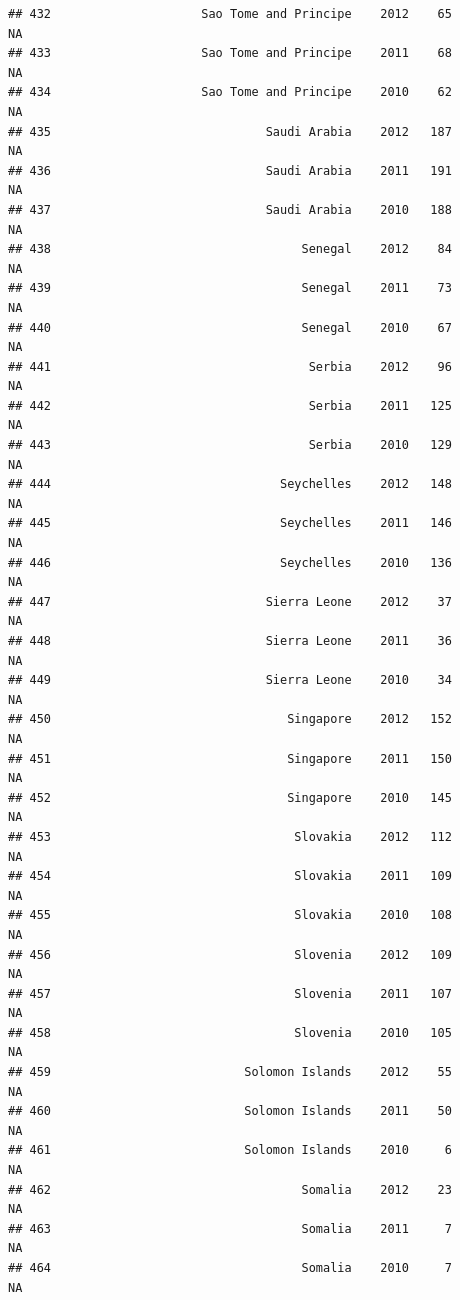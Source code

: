 \documentclass[
]{book}
\begin{document}
\begin{verbatim}
## 432                     Sao Tome and Principe    2012    65              NA
## 433                     Sao Tome and Principe    2011    68              NA
## 434                     Sao Tome and Principe    2010    62              NA
## 435                              Saudi Arabia    2012   187              NA
## 436                              Saudi Arabia    2011   191              NA
## 437                              Saudi Arabia    2010   188              NA
## 438                                   Senegal    2012    84              NA
## 439                                   Senegal    2011    73              NA
## 440                                   Senegal    2010    67              NA
## 441                                    Serbia    2012    96              NA
## 442                                    Serbia    2011   125              NA
## 443                                    Serbia    2010   129              NA
## 444                                Seychelles    2012   148              NA
## 445                                Seychelles    2011   146              NA
## 446                                Seychelles    2010   136              NA
## 447                              Sierra Leone    2012    37              NA
## 448                              Sierra Leone    2011    36              NA
## 449                              Sierra Leone    2010    34              NA
## 450                                 Singapore    2012   152              NA
## 451                                 Singapore    2011   150              NA
## 452                                 Singapore    2010   145              NA
## 453                                  Slovakia    2012   112              NA
## 454                                  Slovakia    2011   109              NA
## 455                                  Slovakia    2010   108              NA
## 456                                  Slovenia    2012   109              NA
## 457                                  Slovenia    2011   107              NA
## 458                                  Slovenia    2010   105              NA
## 459                           Solomon Islands    2012    55              NA
## 460                           Solomon Islands    2011    50              NA
## 461                           Solomon Islands    2010     6              NA
## 462                                   Somalia    2012    23              NA
## 463                                   Somalia    2011     7              NA
## 464                                   Somalia    2010     7              NA

\end{verbatim}
\end{document}
